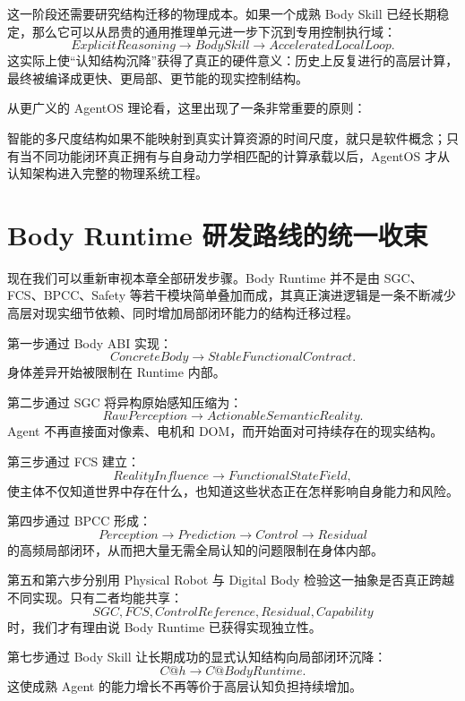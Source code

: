 这一阶段还需要研究结构迁移的物理成本。如果一个成熟 Body Skill 已经长期稳定，那么它可以从昂贵的通用推理单元进一步下沉到专用控制执行域：
\[
ExplicitReasoning
\rightarrow
BodySkill
\rightarrow
AcceleratedLocalLoop.
\]
这实际上使“认知结构沉降”获得了真正的硬件意义：历史上反复进行的高层计算，最终被编译成更快、更局部、更节能的现实控制结构。

从更广义的 AgentOS 理论看，这里出现了一条非常重要的原则：
\begin{statementbox}
\centering
{}
\end{statementbox}
智能的多尺度结构如果不能映射到真实计算资源的时间尺度，就只是软件概念；只有当不同功能闭环真正拥有与自身动力学相匹配的计算承载以后，AgentOS 才从认知架构进入完整的物理系统工程。

\section{Body Runtime 研发路线的统一收束}

现在我们可以重新审视本章全部研发步骤。Body Runtime 并不是由 SGC、FCS、BPCC、Safety 等若干模块简单叠加而成，其真正演进逻辑是一条不断减少高层对现实细节依赖、同时增加局部闭环能力的结构迁移过程。

第一步通过 Body ABI 实现：
\[
ConcreteBody
\rightarrow
StableFunctionalContract.
\]
身体差异开始被限制在 Runtime 内部。

第二步通过 SGC 将异构原始感知压缩为：
\[
RawPerception
\rightarrow
ActionableSemanticReality.
\]
Agent 不再直接面对像素、电机和 DOM，而开始面对可持续存在的现实结构。

第三步通过 FCS 建立：
\[
RealityInfluence
\rightarrow
FunctionalStateField,
\]
使主体不仅知道世界中存在什么，也知道这些状态正在怎样影响自身能力和风险。

第四步通过 BPCC 形成：
\[
Perception
\rightarrow
Prediction
\rightarrow
Control
\rightarrow
Residual
\]
的高频局部闭环，从而把大量无需全局认知的问题限制在身体内部。

第五和第六步分别用 Physical Robot 与 Digital Body 检验这一抽象是否真正跨越不同实现。只有二者均能共享：
\[
SGC,
FCS,
ControlReference,
Residual,
Capability
\]
时，我们才有理由说 Body Runtime 已获得实现独立性。

第七步通过 Body Skill 让长期成功的显式认知结构向局部闭环沉降：
\[
C@h
\rightarrow
C@BodyRuntime.
\]
这使成熟 Agent 的能力增长不再等价于高层认知负担持续增加。

